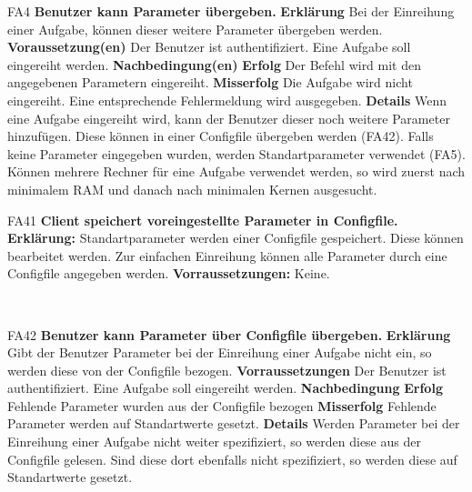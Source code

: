\documentclass[a4paper,12pt]{article}
\begin{document}
\begin{itemize}[nosep]
	\begin{minipage}[t]{\linewidth}
		\item[FA4] \textbf{Benutzer kann Parameter übergeben.}
		\subitem \textbf{Erklärung} Bei der Einreihung einer Aufgabe, können dieser weitere Parameter übergeben werden.
		\subitem \textbf{Voraussetzung(en)} Der Benutzer ist authentifiziert. Eine Aufgabe soll eingereiht werden.
		\subitem \textbf{Nachbedingung(en)}
		\subsubitem \textbf{Erfolg} Der Befehl wird mit den angegebenen Parametern eingereiht.
		\subsubitem \textbf{Misserfolg} Die Aufgabe wird nicht eingereiht. Eine entsprechende Fehlermeldung wird ausgegeben.
		\subitem \textbf{Details} Wenn eine Aufgabe eingereiht wird, kann der \gls{Benutzer} dieser noch weitere Parameter hinzufügen. Diese können in einer \gls{Configfile} übergeben werden (FA42). Falls keine Parameter eingegeben wurden, werden Standartparameter verwendet (FA5).
		Können mehrere Rechner für eine Aufgabe verwendet werden, so wird zuerst nach minimalem RAM und danach nach minimalen Kernen ausgesucht.
	\end{minipage}
	\pagebreak
	
	\begin{minipage}[t]{\linewidth}
		\item[FA41] \textbf{\gls{Client} speichert voreingestellte Parameter in \gls{Configfile}.}
		\subitem \textbf{Erklärung:} Standartparameter werden einer \gls{Configfile} gespeichert.
		Diese können bearbeitet werden. Zur einfachen Einreihung können alle Parameter durch eine Configfile angegeben werden.
		\subitem \textbf{Vorraussetzungen:} Keine.
	\end{minipage}
	\newline
	\\
	
	\begin{minipage}[t]{\linewidth}
		\item[FA42] \textbf{Benutzer kann Parameter über \gls{Configfile} übergeben.}
		\subitem \textbf{Erklärung} Gibt der Benutzer Parameter bei der Einreihung einer Aufgabe nicht ein, so werden diese von der \gls{Configfile} bezogen.
		\subitem \textbf{Vorraussetzungen} Der Benutzer ist authentifiziert. Eine Aufgabe soll eingereiht werden.
		\subitem \textbf{Nachbedingung}
		\subsubitem \textbf{Erfolg} Fehlende Parameter wurden aus der \gls{Configfile} bezogen
		\subsubitem \textbf{Misserfolg} Fehlende Parameter werden auf Standartwerte gesetzt.
		\subitem \textbf{Details} Werden Parameter bei der Einreihung einer Aufgabe nicht weiter spezifiziert, so werden diese aus der \gls{Configfile} gelesen. Sind diese dort ebenfalls nicht spezifiziert, so werden diese auf Standartwerte gesetzt.
	\end{minipage}
	\newline
	\\
	

\end{itemize}
\end{document}
